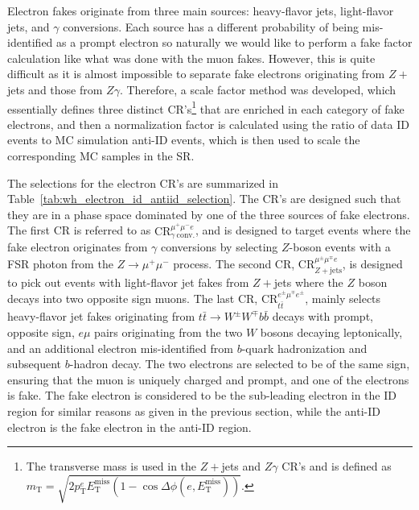 Electron fakes originate from three main sources: heavy-flavor jets, light-flavor jets, and $\gamma$ conversions. Each source has a different probability of being mis-identified as a prompt electron so naturally we would like to perform a fake factor calculation like what was done with the muon fakes. However, this is quite difficult as it is almost impossible to separate fake electrons originating from $Z+$jets and those from $Z\gamma$. Therefore, a scale factor method was developed, which essentially defines three distinct CR's\footnote{The transverse mass is used in the $Z+$jets and $Z\gamma$ CR's and is defined as $m_{\mathrm{T}} = \sqrt{2 p_{\mathrm{T}}^{e} E_{\mathrm{T}}^{\text{miss}} \left(1 - \cos \Delta\phi(e, E_{\mathrm{T}}^{\text{miss}})\right)}$.}
 that are enriched in each category of fake electrons, and then a normalization factor is calculated using the ratio of data ID events to MC simulation anti-ID events, which is then used to scale the corresponding MC samples in the SR\@.

The selections for the electron CR's are summarized in Table~\ref{tab:wh_electron_id_antiid_selection}. The CR's are designed such that they are in a phase space dominated by one of the three sources of fake electrons. The first CR is referred to as $\mathrm{CR}^{\mu^{+}\mu^{-} e}_{\gamma~\mathrm{conv.}}$, and is designed to target events where the fake electron originates from $\gamma$ conversions by selecting $Z$-boson events with a FSR photon from the $Z \to \mu^+\mu^-$ process. The second CR, $\mathrm{CR}^{\mu^{\pm}\mu^{\mp}e}_{Z+\mathrm{jets}}$, is designed to pick out events with light-flavor jet fakes from $Z+$jets where the $Z$ boson decays into two opposite sign muons. The last CR, $\mathrm{CR}^{e^{\pm}\mu^{\mp}e^{\pm}}_{t\bar{t}}$, mainly selects heavy-flavor jet fakes originating from $t\bar{t} \to W^{\pm}W^{\mp}b\bar{b}$ decays with prompt, opposite sign, $e\mu$ pairs originating from the two $W$ bosons decaying leptonically, and an additional electron mis-identified from $b$-quark hadronization and subsequent $b$-hadron decay. The two electrons are selected to be of the same sign, ensuring that the muon is uniquely charged and prompt, and one of the electrons is fake. The fake electron is considered to be the sub-leading electron in the ID region for similar reasons as given in the previous section, while the anti-ID electron is the fake electron in the anti-ID region.

